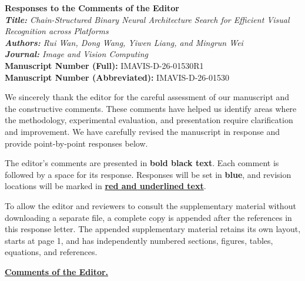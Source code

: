 \documentclass[11pt]{article}
\newcommand{\reviewerheading}[1]{%
  \par\vspace{6mm}\noindent\textbf{\uline{#1}}\par\vspace{3mm}}
\begin{document}
\begin{center}
  {\bfseries Responses to the Comments of the Editor}\\[5pt]
  {\itshape \textbf{Title:} Chain-Structured Binary Neural Architecture Search for Efficient Visual Recognition across Platforms}\\
  {\itshape \textbf{Authors:} Rui Wan, Dong Wang, Yiwen Liang, and Mingrun Wei}\\
  {\itshape \textbf{Journal:} Image and Vision Computing}\\
  {\bfseries Manuscript Number (Full):} IMAVIS-D-26-01530R1\\
  {\bfseries Manuscript Number (Abbreviated):} IMAVIS-D-26-01530
\end{center}

\vspace{3mm}
We sincerely thank the editor for the careful assessment of our manuscript and the constructive comments. These comments have helped us identify areas where the methodology, experimental evaluation, and presentation require clarification and improvement. We have carefully revised the manuscript in response and provide point-by-point responses below.

The editor's comments are presented in \textbf{bold black text}. Each comment is followed by a space for its response. Responses will be set in \textcolor{responseblue}{\textbf{blue}}, and revision locations will be marked in \textcolor{revisionred}{\textbf{\uline{red and underlined text}}}.

To allow the editor and reviewers to consult the supplementary material without downloading a separate file, a complete copy is appended after the references in this response letter. The appended supplementary material retains its own layout, starts at page 1, and has independently numbered sections, figures, tables, equations, and references.

\reviewerheading{Comments of the Editor.}
\end{document}
